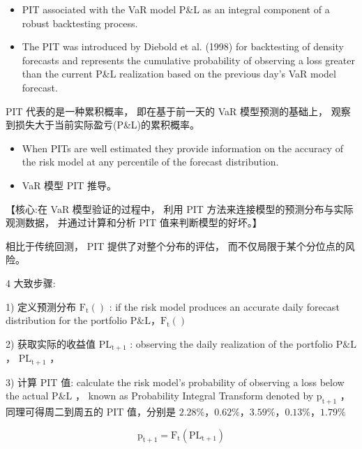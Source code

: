 \begin{itemize}
\item PIT associated with the VaR model P\&L as an integral component of a robust backtesting process.
\end{itemize}

\begin{itemize}
\item The PIT was introduced by Diebold et al. (1998) for backtesting of density forecasts and represents the cumulative probability of observing a loss greater than the current P\&L realization based on the previous day's VaR model forecast.
\end{itemize}

 PIT 代表的是一种累积概率， 即在基于前一天的 VaR 模型预测的基础上， 观察到损失大于当前实际盈亏(P\&L)的累积概率。

\begin{itemize}
\item When PITs are well estimated they provide information on the accuracy of the risk model at any percentile of the forecast distribution.
\end{itemize}

\begin{itemize}
\item VaR 模型 PIT 推导。
\end{itemize}

【核心:在 VaR 模型验证的过程中， 利用 PIT 方法来连接模型的预测分布与实际观测数据， 并通过计算和分析 PIT 值来判断模型的好坏。】

 相比于传统回测， PIT 提供了对整个分布的评估， 而不仅局限于某个分位点的风险。

4 大致步骤:

1) 定义预测分布 \({\mathrm{F}}_{\mathrm{t}}\left( \right)\) : if the risk model produces an accurate daily forecast distribution for the portfolio \(\mathrm{P}\& \mathrm{L}，{\mathrm{F}}_{\mathrm{t}}\left( \right)\)

2) 获取实际的收益值 \({\mathrm{{PL}}}_{\mathrm{t} + 1}\) : observing the daily realization of the portfolio \(\mathrm{P}\& \mathrm{L}\) ， \({\mathrm{{PL}}}_{\mathrm{t} + 1}\) ，

3) 计算 PIT 值: calculate the risk model's probability of observing a loss below the actual \(\mathrm{P}\& \mathrm{L}\) ， known as Probability Integral Transform denoted by \({\mathrm{p}}_{\mathrm{t} + 1}\) ， 同理可得周二到周五的 PIT 值，分别是 \({2.28}\% ，{0.62}\% ，{3.59}\% ，{0.13}\% ，{1.79}\%\)

\[
{\mathrm{p}}_{\mathrm{t} + 1} = {\mathrm{F}}_{\mathrm{t}}\left( {\mathrm{{PL}}}_{\mathrm{t} + 1}\right)
\]

